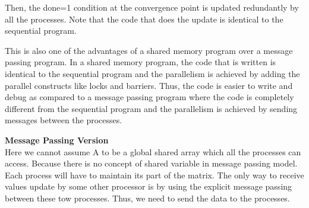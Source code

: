 \documentclass[12pt]{article}
\begin{document}
Then, the done=1 condition at the convergence point is updated redundantly by all the processes.
Note that the code that does the update is identical to the sequential program.

This is also one of the advantages of a shared memory program over a message passing program.
In a shared memory program, the code that is written is identical to the sequential program and the parallelism is achieved by adding the parallel constructs like locks and barriers.
Thus, the code is easier to write and debug as compared to a message passing program where the code is completely different from the sequential program and the parallelism is achieved by sending messages between the processes.

\textbf{Message Passing Version}\\
Here we cannot assume A to be a global shared array which all the processes can access.
Because there is no concept of shared variable in message passing model. Each process will have to maintain its part of the matrix.
The only way to receive values update by some other processor is by using the explicit message passing between these tow processes.
Thus, we need to send the data to the processes.
\end{document}
